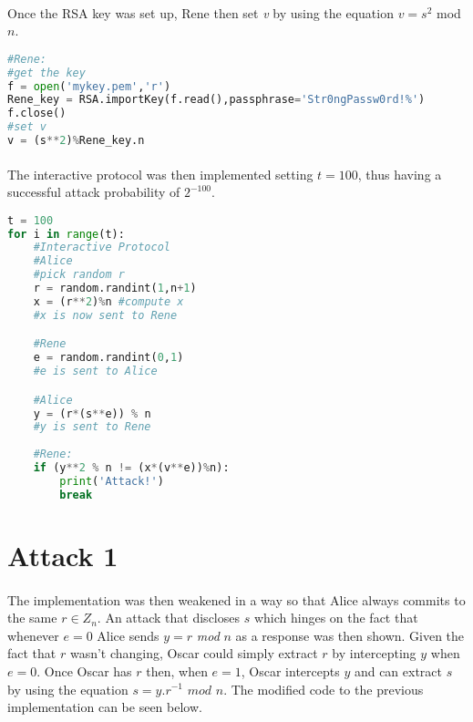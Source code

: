 \paragraph{ } Once the RSA key was set up, Rene then set \textit{v} by using the equation $v=s^2$ mod $n$.

\begin{lstlisting}[language=Python]
#Rene:
#get the key
f = open('mykey.pem','r')
Rene_key = RSA.importKey(f.read(),passphrase='Str0ngPassw0rd!%')
f.close()
#set v
v = (s**2)%Rene_key.n
\end{lstlisting}

\paragraph{ }The interactive protocol was then implemented setting $t=100$, thus having a successful attack probability of $2^{-100}$.

\begin{lstlisting}[language=Python]
t = 100
for i in range(t):
	#Interactive Protocol
	#Alice
	#pick random r
	r = random.randint(1,n+1)
	x = (r**2)%n #compute x
	#x is now sent to Rene

	#Rene
	e = random.randint(0,1)
	#e is sent to Alice

	#Alice
	y = (r*(s**e)) % n
	#y is sent to Rene
	
	#Rene:
	if (y**2 % n != (x*(v**e))%n):
		print('Attack!')
		break
\end{lstlisting}

\section{Attack 1}

\paragraph{ }The implementation was then weakened in a way so that Alice always commits to the same $r \in Z_n$. An attack that discloses $s$ which hinges on the fact that whenever $e=0$ Alice sends $y=r$ \textit{mod} $n$ as a response was then shown. Given the fact that $r$ wasn't changing, Oscar could simply extract $r$ by intercepting $y$ when $e=0$. Once Oscar has $r$ then, when $e=1$, Oscar intercepts $y$ and can extract $s$ by using the equation $s=y.r^{-1}$ $mod$ $n$. The modified code to the previous implementation can be seen below.

